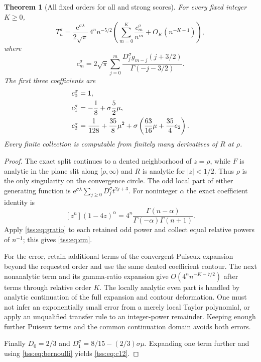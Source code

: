 \documentclass[11pt]{article}
\newtheorem{theorem}{Theorem}[section]
\theoremstyle{remark}\newtheorem{remark}[theorem]{Remark}
\theoremstyle{definition}\newtheorem{definition}[theorem]{Definition}
\newcommand{\e}{\mathrm e}
\begin{document}
\begin{theorem}[All fixed orders for all and strong scores]\label{tss:thm:fixed}
For every fixed integer $K\geq0$,
\begin{equation}\label{tss:eq:fixedall}
T_n^\sigma=\frac{\e^{\sigma\lambda}}{2\sqrt\pi}\,
4^n n^{-5/2}\left(\sum_{m=0}^K\frac{c_m^\sigma}{n^m}
 +O_K(n^{-K-1})\right),
\end{equation}
where
\begin{equation}\label{tss:eq:cm}
c_m^\sigma=2\sqrt\pi\sum_{j=0}^m
 \frac{D_j^\sigma g_{m-j}(j+3/2)}{\Gamma(-j-3/2)}.
\end{equation}
The first three coefficients are
\begin{align}
c_0^\sigma&=1,\notag\\
c_1^\sigma&=-\frac18+\sigma\frac52\mu,\label{tss:eq:c12}\\
c_2^\sigma&=\frac1{128}+\frac{35}8\mu^2
 +\sigma\left(\frac{63}{16}\mu+\frac{35}4e_2\right).\notag
\end{align}
Every finite collection is computable from finitely many derivatives of $R$ at $\rho$.
\end{theorem}

\begin{proof}
The exact split continues to a dented neighborhood of $z=\rho$, while $F$ is analytic in the plane slit along $[\rho,\infty)$ and $R$ is analytic for $|z|<1/2$. Thus $\rho$ is the only singularity on the convergence circle. The odd local part of either generating function is
$\e^{\sigma\lambda}\sum_{j\geq0}D_j^\sigma t^{2j+3}$.
For noninteger $\alpha$ the exact coefficient identity is
\begin{equation}\label{tss:eq:transfer}
[z^n](1-4z)^\alpha
 =4^n\frac{\Gamma(n-\alpha)}{\Gamma(-\alpha)\Gamma(n+1)}.
\end{equation}
Apply \eqref{tss:eq:gratio} to each retained odd power and collect equal relative powers of $n^{-1}$; this gives \eqref{tss:eq:cm}.

For the error, retain additional terms of the convergent Puiseux expansion beyond the requested order and use the same dented coefficient contour. The next nonanalytic term and its gamma-ratio expansion give
$O(4^n n^{-K-7/2})$ after terms through relative order $K$. The locally analytic even part is handled by analytic continuation of the full expansion and contour deformation. One must not infer an exponentially small error from a merely local Taylor polynomial, or apply an unqualified transfer rule to an integer-power remainder. Keeping enough further Puiseux terms and the common continuation domain avoids both errors.

Finally $D_0=2/3$ and
$D_1^\sigma=8/15-(2/3)\sigma\mu$. Expanding one term further and using \eqref{tss:eq:bernoulli} yields \eqref{tss:eq:c12}.
\end{proof}
\end{document}
